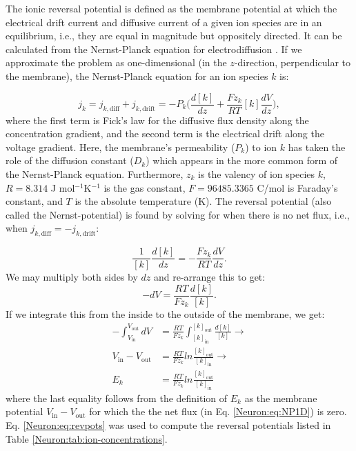 The ionic reversal potential is defined as the membrane potential at which the electrical drift current and diffusive current of a given ion species are in an equilibrium, i.e., they are equal in magnitude but oppositely directed. It can be calculated from the Nernst-Planck equation for electrodiffusion . If we approximate the problem as one-dimensional (in the $z$-direction, perpendicular to the membrane), the Nernst-Planck equation for an ion species $k$ is:

\begin{equation}
j_k = j_{k,\text{diff}} + j_{k,\text{drift}} 
=  - P_k \Big(\frac{d[k]}{dz} +  \frac{Fz_k}{RT}  [k] \frac{dV}{dz} \Big), 
\label{Neuron:eq:NP1D}
\end{equation}
where the first term is Fick's law for the diffusive flux density along the concentration gradient, and the second term is the electrical drift along the voltage gradient. Here, the membrane's permeability ($P_k$) to ion $k$ has taken the role of the diffusion constant ($D_k$) which appears in the more common form of the Nernst-Planck equation. Furthermore, $z_{k}$ is the valency of ion species $k$, $R = 8.314$ J mol$^{-1}$K$^{-1}$ is the gas constant, $F = 96485.3365$ C/mol is Faraday's constant, and $T$ is the absolute temperature (K). The reversal potential (also called the Nernst-potential) is found by solving for when there is no net flux, i.e., when  $j_{k,\text{diff}} = - j_{k,\text{drift}}$:

\begin{equation}
\frac{1}{[k]} \frac{d[k]}{dz} = - \frac{Fz_k}{RT}  \frac{dV}{dz}.
\end{equation}
We may multiply both sides by $dz$ and re-arrange this to get:
\begin{equation}
-dV = \frac{RT}{Fz_k}  \frac{d[k]}{[k]}.
\end{equation}
If we integrate this from the inside to the outside of the membrane, we get:
\begin{align}
-\int_{V_{\text{in}}}^{V_{\text{out}}}  dV &= \frac{RT}{Fz_k}  \int_{[k]_{\text{in}}}^{[k]_{\text{out}}} \frac{d[k]}{[k]} \rightarrow \\
V_{\text{in}}-V_{\text{out}} &= \frac{RT}{Fz_k} ln \frac{[k]_{\text{out}}} {[k]_{\text{in}}} \rightarrow \\
E_k & =  \frac{RT}{Fz_k}  ln \frac{[k]_{\text{out}}} {[k]_{\text{in}}} 
\label{Neuron:eq:revpots}
\end{align}
where the last equality follows from the definition of $E_k$ as the membrane potential $V_{\text{in}}-V_{\text{out}}$ for which the the net flux (in Eq. \ref{Neuron:eq:NP1D}) is zero. Eq. \ref{Neuron:eq:revpots} was used to compute the reversal potentials listed in Table \ref{Neuron:tab:ion-concentrations}. 


